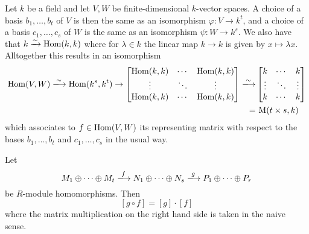 \begin{example}
  Let $k$ be a field and let $V, W$ be finite-dimensional $k$-vector spaces.
  A choice of a basis $b_1, \dotsc, b_t$ of $V$ is then the same as an isomorphism $\varphi \colon V \to k^t$, and a choice of a basis $c_1, \dotsc, c_s$ of $W$ is the same as an isomorphism $\psi \colon W \to k^s$.
  We also have that $k \xrightarrow{\sim} \operatorname{Hom}(k,k)$ where for $\lambda \in k$ the linear map $k \to k$ is given by $x \mapsto \lambda x$.
  Alltogether this results in an isomorphism
  \begin{align*}
      \Hom(V,W)
    \xlongrightarrow{\sim}
      \Hom(k^s, k^t)
    \to
      \begin{bmatrix}
        \Hom(k,k) & \cdots  & \Hom(k,k) \\
        \vdots    & \ddots  & \vdots    \\
        \Hom(k,k) & \cdots  & \Hom(k,k)
      \end{bmatrix}
    \xlongrightarrow{\sim}&
      \begin{bmatrix}
        k       & \cdots  & k       \\
        \vdots  & \ddots  & \vdots  \\
        k       & \cdots  & k
      \end{bmatrix}
    \\
    =&\,
      \Mat(t \times s, k)
  \end{align*}
  which associates to $f \in \operatorname{Hom}(V, W)$ its representing matrix with respect to the bases $b_1, \dotsc, b_t$ and $c_1, \dotsc, c_s$ in the usual way.
\end{example}


\begin{theorem}
  Let
  \[
    M_1 \oplus \dotsb \oplus M_t
    \xlongrightarrow{f}
    N_1 \oplus \dotsb \oplus N_s
    \xlongrightarrow{g}
    P_1 \oplus \dotsb \oplus P_r
  \]
  be $R$-module homomorphisms.
  Then
  \[
      [g \circ f]
    = [g] \cdot [f]
  \]
  where the matrix multiplication on the right hand side is taken in the naive sense.
\end{theorem}


